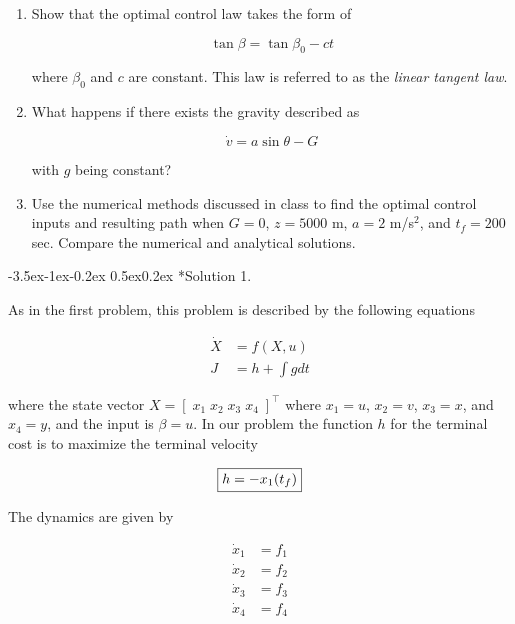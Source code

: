 \documentclass[11pt,letterpaper,onecolumn,notitlepage]{article}
\makeatletter
\renewcommand\subsection{\@startsection{subsection}{1}{\z@}%
{-3.5ex\@plus-1ex\@minus-0.2ex}%
{0.5ex\@plus0.2ex}%
{\fontsize{10pt}{10pt}\selectfont\bfseries\sffamily}}
\makeatother
\begin{document}
\begin{enumerate}
  \item{Show that the optimal control law takes the form of}

  \begin{equation*}
    \tan\beta=\tan\beta_{0}-ct
  \end{equation*}

  where $\beta_{0}$ and $c$ are constant.
  This law is referred to as the \textit{linear tangent law}.

  \item{What happens if there exists the gravity described as}

  \begin{equation*}
  \dot{v}=a\sin\theta-G
  \end{equation*}

  with $g$ being constant?

  \item{%
    Use the numerical methods discussed in class to find the optimal control inputs and resulting path when $G=0$, $z=5000$ m, $a=2$ m/s$^2$, and $t_{f}=200$ sec.
    Compare the numerical and analytical solutions.
  }
\end{enumerate}

\subsection*{Solution 1.}

As in the first problem, this problem is described by the following equations

\begin{align*}
  \dot{X}&=f(X,u) \\
  J&=h+\int g dt
\end{align*}

where the state vector $X=[\;x_{1}\;x_{2}\;x_{3}\;x_{4}\;]^{\top}$ where $x_{1}=u$, $x_{2}=v$, $x_{3}=x$, and $x_{4}=y$, and the input is $\beta=u$.
In our problem the function $h$ for the terminal cost is to maximize the terminal velocity

\begin{equation*}
  \boxed{%
    h=-x_{1}(t_{f})
  }
\end{equation*}

The dynamics are given by

\begin{align*}
  \dot{x}_{1}&=f_{1} \\
  \dot{x}_{2}&=f_{2} \\
  \dot{x}_{3}&=f_{3} \\
  \dot{x}_{4}&=f_{4}
\end{align*}
\end{document}
